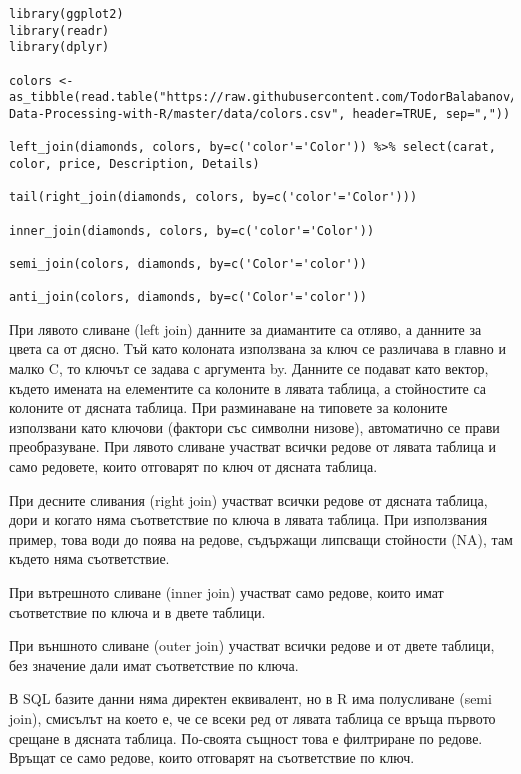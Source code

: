 \begin{lstlisting}[caption=Сложни сливания, label=listing0141]
library(ggplot2)
library(readr)
library(dplyr)

colors <- as_tibble(read.table("https://raw.githubusercontent.com/TodorBalabanov/Statistical-Data-Processing-with-R/master/data/colors.csv", header=TRUE, sep=","))

left_join(diamonds, colors, by=c('color'='Color')) %>% select(carat, color, price, Description, Details)

tail(right_join(diamonds, colors, by=c('color'='Color')))

inner_join(diamonds, colors, by=c('color'='Color'))

semi_join(colors, diamonds, by=c('Color'='color'))

anti_join(colors, diamonds, by=c('Color'='color'))
\end{lstlisting}

При лявото сливане (left join) данните за диамантите са отляво, а данните за цвета са от дясно. Тъй като колоната използвана за ключ се различава в главно и малко C, то ключът се задава с аргумента by. Данните се подават като вектор, където имената на елементите са колоните в лявата таблица, а стойностите са колоните от дясната таблица. При разминаване на типовете за колоните използвани като ключови (фактори със символни низове), автоматично се прави преобразуване. При лявото сливане участват всички редове от лявата таблица и само редовете, които отговарят по ключ от дясната таблица.

При десните сливания (right join) участват всички редове от дясната таблица, дори и когато няма съответствие по ключа в лявата таблица. При използвания пример, това води до поява на редове, съдържащи липсващи стойности (NA), там където няма съответствие.

При вътрешното сливане (inner join) участват само редове, които имат съответствие по ключа и в двете таблици.

При външното сливане (outer join) участват всички редове и от двете таблици, без значение дали имат съответствие по ключа.

В SQL базите данни няма директен еквивалент, но в R има полусливане (semi join), смисълът на което е, че се всеки ред от лявата таблица се връща първото срещане в дясната таблица. По-своята същност това е филтриране по редове. Връщат се само редове, които отговарят на съответствие по ключ.

